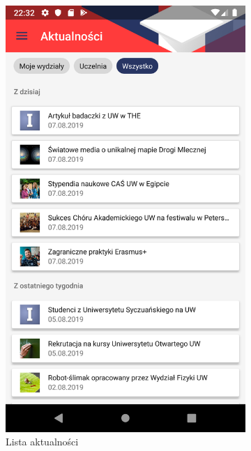 \documentclass{pracamgr}
\begin{document}
\begin{figure}[p]
	\centering
	\begin{subfigure}[t]{0.3\textwidth}
		\includegraphics[width=\textwidth]{img/news_list.png}
		\caption{Lista aktualności}
		\label{fig:news_list}
	\end{subfigure}
	\quad
	\begin{subfigure}[t]{0.3\textwidth}

\end{subfigure}
\end{figure}
\end{document}
